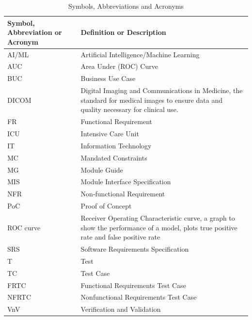 \documentclass[12pt, titlepage]{article}
\begin{document}
\renewcommand{\arraystretch}{1.2}
\begin{table}[H]
    \centering
    \label{tab:symbsAbbrevsAcros}
    \begin{tabular}{p{1.25in}p{3.75in}}
        \toprule
        \textbf{Symbol, Abbreviation or Acronym} & \textbf{Definition or Description} \\
        \midrule
        AI/ML & Artificial Intelligence/Machine Learning \\
        AUC & Area Under (ROC) Curve \\
        BUC & Business Use Case \\
        DICOM & Digital Imaging and Communications in Medicine, the standard for medical images to ensure data and quality necessary for clinical use.\\
        FR & Functional Requirement \\
        ICU & Intensive Care Unit \\
        IT & Information Technology \\
        MC & Mandated Constraints \\
        MG & Module Guide \\
        MIS & Module Interface Specification \\
        NFR & Non-functional Requirement \\
        PoC & Proof of Concept\\
        ROC curve & Receiver Operating Characteristic curve, a graph to show the performance of a model, plots true positive rate and false positive rate \\
        SRS & Software Requirements Specification \\
        T & Test \\
        TC & Test Case \\
        FRTC & Functional Requirements Test Case \\
        NFRTC & Nonfunctional Requirements Test Case \\
        VnV & Verification and Validation \\
        \bottomrule
    \end{tabular}\\
    \caption{Symbols, Abbreviations and Acronyms}
\end{table}

\newpage

\tableofcontents

\listoftables %

\listoffigures %
\end{document}
